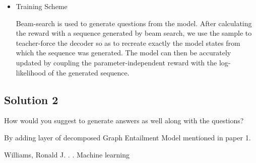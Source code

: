 \documentclass[12pt,leqno,a4paper]{article}
\begin{document}
\begin{itemize}
\item Training Scheme

Beam-search is used to generate questions from the model. After calculating the reward with a sequence generated by beam search, we use the sample to teacher-force the decoder so as to recreate exactly the model states from which the sequence was generated. The model can then be accurately updated by coupling the parameter-independent reward with the log-likelihood of the generated sequence. 
\end{itemize}


\subsection{Solution 2}
How would you suggest to generate answers as well along with the questions?
\newline

By adding layer of decomposed Graph Entailment Model mentioned in paper 1. 

\begin{thebibliography}{}
Williams, Ronald J.
.
.
\newblock Machine learning

\end{thebibliography}
\end{document}
